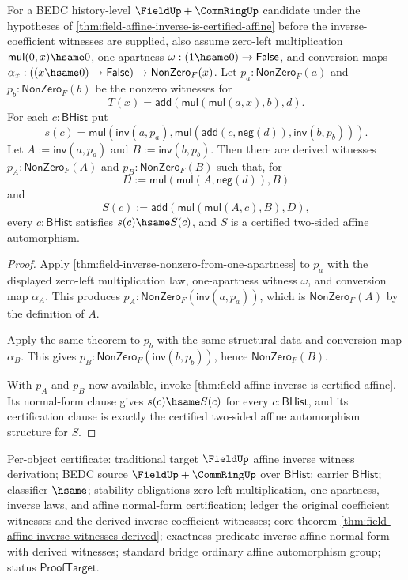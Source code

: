 \begin{theorem}
\label{thm:field-affine-inverse-witnesses-derived}
For a BEDC history-level $\FieldUp+\CommRingUp$ candidate under the hypotheses
of \autoref{thm:field-affine-inverse-is-certified-affine} before the
inverse-coefficient witnesses are supplied, also assume zero-left
multiplication $\mathsf{mul}(0,x)\hsame 0$, one-apartness
$\omega:(1\hsame 0)\to\mathsf{False}$, and conversion maps
$\alpha_x:((x\hsame 0)\to\mathsf{False})\to\mathsf{NonZero}_F(x)$.
Let $p_a:\mathsf{NonZero}_F(a)$ and $p_b:\mathsf{NonZero}_F(b)$ be the
nonzero witnesses for
$$
T(x)=\mathsf{add}(\mathsf{mul}(\mathsf{mul}(a,x),b),d).
$$
For each $c:\mathsf{BHist}$ put
$$
s(c)=
\mathsf{mul}(\mathsf{inv}(a,p_a),
\mathsf{mul}(\mathsf{add}(c,\mathsf{neg}(d)),\mathsf{inv}(b,p_b))).
$$
Let $A:=\mathsf{inv}(a,p_a)$ and $B:=\mathsf{inv}(b,p_b)$. Then there are
derived witnesses $p_A:\mathsf{NonZero}_F(A)$ and
$p_B:\mathsf{NonZero}_F(B)$ such that, for
$$
D:=\mathsf{mul}(\mathsf{mul}(A,\mathsf{neg}(d)),B)
$$
and
$$
S(c):=\mathsf{add}(\mathsf{mul}(\mathsf{mul}(A,c),B),D),
$$
every $c:\mathsf{BHist}$ satisfies $s(c)\hsame S(c)$, and $S$ is a certified
two-sided affine automorphism.
\end{theorem}
\begin{proof}
Apply \autoref{thm:field-inverse-nonzero-from-one-apartness} to $p_a$ with
the displayed zero-left multiplication law, one-apartness witness $\omega$, and
conversion map $\alpha_A$. This produces
$p_A:\mathsf{NonZero}_F(\mathsf{inv}(a,p_a))$, which is
$\mathsf{NonZero}_F(A)$ by the definition of $A$.

Apply the same theorem to $p_b$ with the same structural data and conversion
map $\alpha_B$. This gives
$p_B:\mathsf{NonZero}_F(\mathsf{inv}(b,p_b))$, hence
$\mathsf{NonZero}_F(B)$.

With $p_A$ and $p_B$ now available, invoke
\autoref{thm:field-affine-inverse-is-certified-affine}. Its normal-form clause
gives $s(c)\hsame S(c)$ for every $c:\mathsf{BHist}$, and its certification
clause is exactly the certified two-sided affine automorphism structure for
$S$.
\end{proof}

Per-object certificate: traditional target $\FieldUp$ affine inverse witness
derivation; BEDC source $\FieldUp+\CommRingUp$ over $\mathsf{BHist}$; carrier
$\mathsf{BHist}$; classifier $\hsame$; stability obligations zero-left
multiplication, one-apartness, inverse laws, and affine normal-form
certification; ledger the original coefficient witnesses and the derived
inverse-coefficient witnesses; core theorem
\autoref{thm:field-affine-inverse-witnesses-derived}; exactness predicate
inverse affine normal form with derived witnesses; standard bridge ordinary
affine automorphism group; status $\mathsf{ProofTarget}$.

